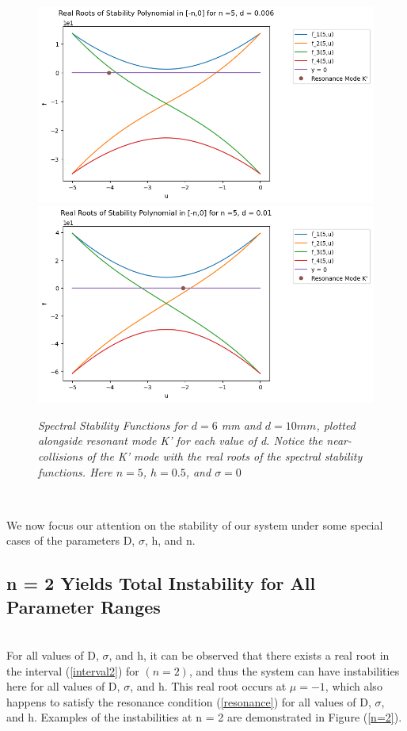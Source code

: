 \documentclass{article}
\begin{document}
\begin{figure}[hbt!]
\centering
\includegraphics[width=.44\textwidth]{k2.png}\hfill
\includegraphics[width=.44\textwidth]{k6.png}\hfill
\caption{\emph{Spectral Stability Functions for \(d = 6\) mm and \(d = 10 mm\), plotted alongside resonant mode K' for each value of d. Notice the near-collisions of the K' mode with the real roots of the spectral stability functions. Here \(n = 5\), \(h = 0.5\), and \(\sigma = 0\)}} \label{nearres}
\end{figure}
\\

\clearpage


We now focus our attention on the stability of our system under some special cases of the parameters D, \(\sigma\), h, and n. 

\subsection{n = 2 Yields Total Instability for All Parameter Ranges}
\\

For all values of D, \(\sigma\), and h, it can be observed that there exists a real root in the interval (\ref{interval2}) for \((n = 2)\), and thus the system can have instabilities here for all values of D, \(\sigma\), and h. This real root occurs at \(\mu = -1\), which also happens to satisfy the resonance condition (\ref{resonance}) for all values of D, \(\sigma\), and h. Examples of the instabilities at n = 2 are demonstrated in Figure (\ref{n=2}). 
\\
\end{document}
